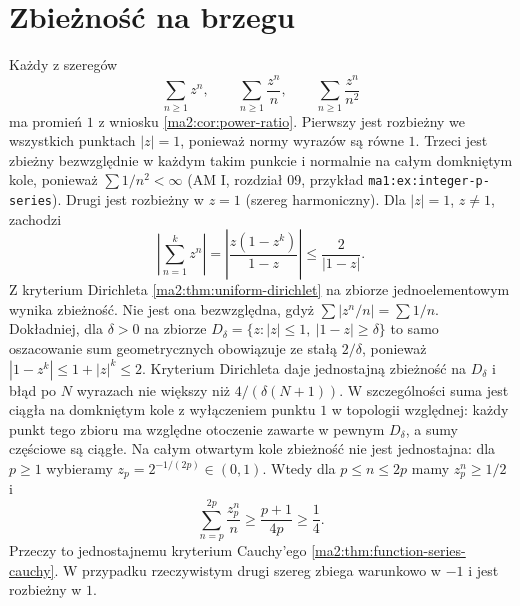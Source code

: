 \section{Zbieżność na brzegu}

\begin{przyklad}
\label{ma2:ex:power-boundary}
Każdy z szeregów
\[
 \sum_{n\ge1}z^n,\qquad
 \sum_{n\ge1}\frac{z^n}{n},\qquad
 \sum_{n\ge1}\frac{z^n}{n^2}
\]
ma promień $1$ z wniosku \ref{ma2:cor:power-ratio}.
Pierwszy jest rozbieżny we wszystkich punktach
$|z|=1$, ponieważ normy wyrazów są równe $1$.
Trzeci jest zbieżny bezwzględnie w każdym
takim punkcie i normalnie na całym domkniętym
kole, ponieważ $\sum 1/n^2<\infty$
(AM I, rozdział 09, przykład
\texttt{ma1:ex:integer-p-series}).
Drugi jest rozbieżny w $z=1$ (szereg harmoniczny).
Dla $|z|=1$, $z\ne1$, zachodzi
\[
 \left|\sum_{n=1}^k z^n\right|
 =\left|\frac{z(1-z^k)}{1-z}\right|
 \le\frac{2}{|1-z|}.
\]
Z kryterium Dirichleta
\ref{ma2:thm:uniform-dirichlet} na zbiorze
jednoelementowym wynika zbieżność. Nie jest
ona bezwzględna, gdyż $\sum |z^n/n|=\sum1/n$.
Dokładniej, dla $\delta>0$ na zbiorze
$D_\delta=\{z:|z|\le1,\ |1-z|\ge\delta\}$
to samo oszacowanie sum geometrycznych
obowiązuje ze stałą $2/\delta$, ponieważ
$|1-z^k|\le1+|z|^k\le2$.
Kryterium Dirichleta daje jednostajną zbieżność
na $D_\delta$ i błąd po $N$ wyrazach
nie większy niż $4/(\delta(N+1))$.
W szczególności suma jest ciągła na
domkniętym kole z wyłączeniem punktu $1$
w topologii względnej: każdy punkt tego zbioru
ma względne otoczenie zawarte w pewnym
$D_\delta$, a sumy częściowe są ciągłe.
Na całym otwartym kole zbieżność nie jest
jednostajna: dla $p\ge1$ wybieramy
$z_p=2^{-1/(2p)}\in(0,1)$.
Wtedy dla $p\le n\le2p$ mamy
$z_p^n\ge1/2$ i
\[
 \sum_{n=p}^{2p}\frac{z_p^n}{n}
 \ge\frac{p+1}{4p}\ge\frac14.
\]
Przeczy to jednostajnemu kryterium Cauchy'ego
\ref{ma2:thm:function-series-cauchy}. W przypadku rzeczywistym
drugi szereg zbiega warunkowo w $-1$
i jest rozbieżny w $1$.
\end{przyklad}

